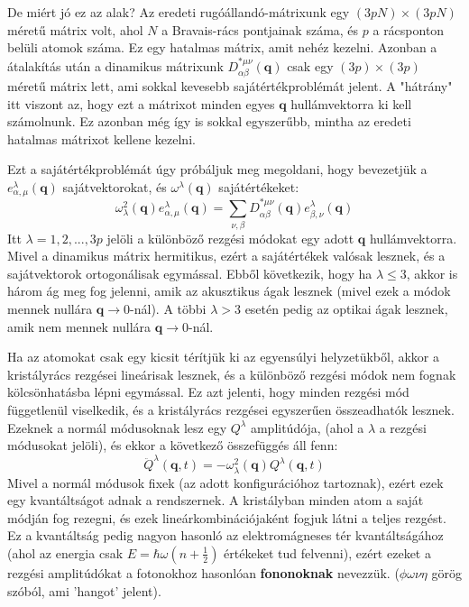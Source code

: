 \documentclass[../main.tex]{subfiles}
\begin{document}
De miért jó ez az alak? Az eredeti rugóállandó-mátrixunk egy $(3pN) \times (3pN)$ méretű mátrix volt, ahol $N$ a Bravais-rács pontjainak száma, és $p$ a rácsponton belüli atomok száma. Ez egy hatalmas mátrix, amit nehéz kezelni. Azonban a
átalakítás után a dinamikus mátrixunk $D^{* \mu \nu}_{\alpha \beta} (\mathbf{q})$ csak egy $(3p) \times (3p)$ méretű mátrix lett, ami sokkal kevesebb sajátértékproblémát jelent. A "hátrány" itt viszont az, hogy ezt a mátrixot minden egyes $\mathbf{q}$ hullámvektorra ki kell számolnunk.
Ez azonban még így is sokkal egyszerűbb, mintha az eredeti hatalmas mátrixot kellene kezelni.

Ezt a sajátértékproblémát úgy próbáljuk meg megoldani, hogy bevezetjük a $e^\lambda_{\alpha, \mu} (\mathbf{q})$ sajátvektorokat, és $\omega^\lambda (\mathbf{q})$ sajátértékeket:
\begin{equation}
    \omega^2_\lambda (\mathbf{q}) e^\lambda_{\alpha, \mu} (\mathbf{q}) = \sum_{\nu, \beta} D^{* \mu \nu}_{\alpha \beta} (\mathbf{q}) e^\lambda_{\beta, \nu} (\mathbf{q})
\end{equation}
Itt $\lambda = 1, 2, ..., 3p$ jelöli a különböző rezgési módokat egy adott $\mathbf{q}$ hullámvektorra. Mivel a dinamikus mátrix hermitikus, ezért a sajátértékek valósak lesznek, és a sajátvektorok ortogonálisak egymással.
Ebből következik, hogy ha $\lambda \leq 3$, akkor is három ág meg fog jelenni, amik az akusztikus ágak lesznek (mivel ezek a módok mennek nullára $\mathbf{q} \to 0$-nál). A többi $\lambda > 3$ esetén pedig az optikai ágak lesznek, amik nem mennek nullára $\mathbf{q} \to 0$-nál.

Ha az atomokat csak egy kicsit térítjük ki az egyensúlyi helyzetükből, akkor a kristályrács rezgései lineárisak lesznek, és a különböző rezgési módok nem fognak kölcsönhatásba lépni egymással. Ez azt jelenti, hogy minden rezgési mód függetlenül viselkedik,
és a kristályrács rezgései egyszerűen összeadhatók lesznek. Ezeknek a normál módusoknak lesz egy $Q^\lambda$ amplitúdója, (ahol a $\lambda$ a rezgési módusokat jelöli), és ekkor a következő összefüggés áll fenn:
\begin{equation}
    \boxed{\ddot{Q}^\lambda (\mathbf{q}, t) = - \omega^2_\lambda (\mathbf{q}) Q^\lambda (\mathbf{q}, t)}
\end{equation}
Mivel a normál módusok fixek (az adott konfigurációhoz tartoznak), ezért ezek egy kvantáltságot adnak a rendszernek. A kristályban minden atom a saját módján fog rezegni, és ezek lineárkombinációjaként fogjuk látni a teljes rezgést.
Ez a kvantáltság pedig nagyon hasonló az elektromágneses tér kvantáltságához (ahol az energia csak $E = \hbar \omega (n + \frac{1}{2})$ értékeket tud felvenni), ezért ezeket a rezgési amplitúdókat a fotonokhoz hasonlóan \textbf{fononoknak} nevezzük. ($\phi \omega \nu \eta$ görög szóból, ami 'hangot' jelent).
\end{document}
